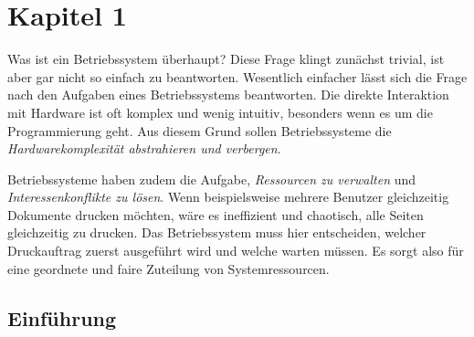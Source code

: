 \chapter{Kapitel 1}

Was ist ein Betriebssystem überhaupt? Diese Frage klingt zunächst trivial, ist
aber gar nicht so einfach zu beantworten. Wesentlich einfacher lässt sich die
Frage nach den Aufgaben eines Betriebssystems beantworten. Die direkte
Interaktion mit Hardware ist oft komplex und wenig intuitiv, besonders wenn es
um die Programmierung geht. Aus diesem Grund sollen Betriebssysteme die
\textit{Hardwarekomplexität abstrahieren und verbergen}.

Betriebssysteme haben zudem die Aufgabe, \textit{Ressourcen zu verwalten} und
\textit{Interessenkonflikte zu lösen}. Wenn beispielsweise mehrere Benutzer
gleichzeitig Dokumente drucken möchten, wäre es ineffizient und chaotisch, alle
Seiten gleichzeitig zu drucken. Das Betriebssystem muss hier entscheiden,
welcher Druckauftrag zuerst ausgeführt wird und welche warten müssen. Es sorgt
also für eine geordnete und faire Zuteilung von Systemressourcen.

\section{Einführung}

